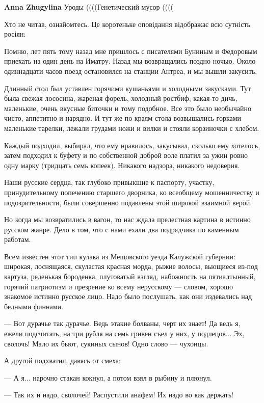 \begin{itemize}
\begin{itemize}
\textbf{Anna Zhugylina} Уроды ((((Генетический мусор ((((


Хто не читав, ознайомтесь. Це коротеньке оповідання відображає всю сутність
росіян:

Помню, лет пять тому назад мне пришлось с писателями Буниным и Федоровым
приехать на один день на Иматру. Назад мы возвращались поздно ночью. Около
одиннадцати часов поезд остановился на станции Антреа, и мы вышли закусить.

Длинный стол был уставлен горячими кушаньями и холодными закусками. Тут была
свежая лососина, жареная форель, холодный ростбиф, какая-то дичь, маленькие,
очень вкусные биточки и тому подобное. Все это было необычайно чисто, аппетитно
и нарядно. И тут же по краям стола возвышались горками маленькие тарелки,
лежали грудами ножи и вилки и стояли корзиночки с хлебом.

Каждый подходил, выбирал, что ему нравилось, закусывал, сколько ему хотелось,
затем подходил к буфету и по собственной доброй воле платил за ужин ровно одну
марку (тридцать семь копеек). Никакого надзора, никакого недоверия.

Наши русские сердца, так глубоко привыкшие к паспорту, участку, принудительному
попечению старшего дворника, ко всеобщему мошенничеству и подозрительности,
были совершенно подавлены этой широкой взаимной верой.

Но когда мы возвратились в вагон, то нас ждала прелестная картина в истинно
русском жанре. Дело в том, что с нами ехали два подрядчика по каменным работам.

Всем известен этот тип кулака из Мещовского уезда Калужской губернии: широкая,
лоснящаяся, скуластая красная морда, рыжие волосы, вьющиеся из-под картуза,
реденькая бороденка, плутоватый взгляд, набожность на пятиалтынный, горячий
патриотизм и презрение ко всему нерусскому — словом, хорошо знакомое истинно
русское лицо. Надо было послушать, как они издевались над бедными финнами.

— Вот дурачье так дурачье. Ведь этакие болваны, черт их знает! Да ведь я, ежели
подсчитать, на три рубля на семь гривен съел у них, у подлецов... Эх, сволочь!
Мало их бьют, сукиных сынов! Одно слово — чухонцы.

А другой подхватил, давясь от смеха:

— А я... нарочно стакан кокнул, а потом взял в рыбину и плюнул.

— Так их и надо, сволочей! Распустили анафем! Их надо во как держать!


\end{itemize}
\end{itemize}
